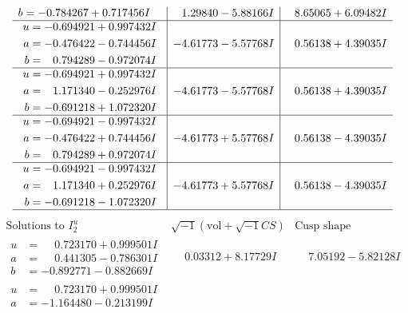 \documentclass[1p]{elsarticle_modified}
\theoremstyle{definition}
\newcommand{\I}{\sqrt{-1}}
\begin{document}
$$\begin{array}{c|c|c}
\begin{aligned}
b &= -0.784267 + 0.717456 I\end{aligned}
 & \phantom{-}1.29840 - 5.88166 I & \phantom{-}8.65065 + 6.09482 I \\ \hline\begin{aligned}
u &= -0.694921 + 0.997432 I \\
a &= -0.476422 - 0.744456 I \\
b &= \phantom{-}0.794289 - 0.972074 I\end{aligned}
 & -4.61773 - 5.57768 I & \phantom{-}0.56138 + 4.39035 I \\ \hline\begin{aligned}
u &= -0.694921 + 0.997432 I \\
a &= \phantom{-}1.171340 - 0.252976 I \\
b &= -0.691218 + 1.072320 I\end{aligned}
 & -4.61773 - 5.57768 I & \phantom{-}0.56138 + 4.39035 I \\ \hline\begin{aligned}
u &= -0.694921 - 0.997432 I \\
a &= -0.476422 + 0.744456 I \\
b &= \phantom{-}0.794289 + 0.972074 I\end{aligned}
 & -4.61773 + 5.57768 I & \phantom{-}0.56138 - 4.39035 I \\ \hline\begin{aligned}
u &= -0.694921 - 0.997432 I \\
a &= \phantom{-}1.171340 + 0.252976 I \\
b &= -0.691218 - 1.072320 I\end{aligned}
 & -4.61773 + 5.57768 I & \phantom{-}0.56138 - 4.39035 I\\
 \hline 
 \end{array}$$\newpage$$\begin{array}{c|c|c}  
\text{Solutions to }I^u_{2}& \I (\text{vol} + \sqrt{-1}CS) & \text{Cusp shape}\\
 \hline 
\begin{aligned}
u &= \phantom{-}0.723170 + 0.999501 I \\
a &= \phantom{-}0.441305 - 0.786301 I \\
b &= -0.892771 - 0.882669 I\end{aligned}
 & \phantom{-}0.03312 + 8.17729 I & \phantom{-}7.05192 - 5.82128 I \\ \hline\begin{aligned}
u &= \phantom{-}0.723170 + 0.999501 I \\
a &= -1.164480 - 0.213199 I \\

\end{aligned}
\end{array}$$
\end{document}
